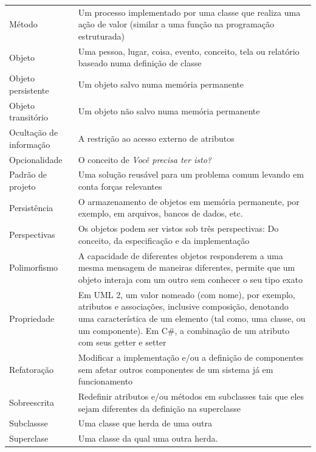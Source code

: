 \documentclass[
	11pt,				%
	openright,
	twoside,			%
	a4paper,			%
	english,			%
	french,
	brazil,				%
	sumario=tradicional
	]{abntex2}
\begin{document}
\begin{longtable}[l]{p{4.6cm}p{11.1cm}}
Método & Um processo implementado por uma classe que realiza uma ação de valor (similar a uma função na programação estruturada)\\

Objeto & Uma pessoa, lugar, coisa, evento, conceito, tela ou relatório baseado numa definição de classe\\

Objeto persistente & Um objeto salvo numa memória permanente\\

Objeto transitório & Um objeto não salvo numa memória permanente\\

Ocultação de informação & A restrição ao acesso externo de atributos\\

Opcionalidade & O conceito de \emph{Você precisa ter isto?}\\

Padrão de projeto & Uma solução reusável para um problema comum levando em conta forças relevantes\\

Persistência & O armazenamento de objetos em memória permanente, por exemplo, em arquivos, bancos de dados, etc.\\

Perspectivas & Os objetos podem ser vistos sob três perspectivas: Do conceito, da especificação e da implementação \\

Polimorfismo & A capacidade de diferentes objetos responderem a uma mesma mensagem de maneiras diferentes, permite que um objeto interaja com um outro sem conhecer o seu tipo exato\\

Propriedade & Em UML 2, um valor nomeado (com nome), por exemplo, atributos e associações, inclusive composição, denotando uma característica de um elemento (tal como, uma classe, ou um componente). Em C\#, a combinação de um atributo com seus getter e setter \\

Refatoração & Modificar a implementação e/ou a definição de componentes sem afetar outros componentes de um sistema já em funcionamento\\

Sobreescrita & Redefinir atributos e/ou métodos em subclasses tais que eles sejam diferentes da definição na superclasse\\

Subclassse & Uma classe que herda de uma outra\\

Superclase & Uma classe da qual uma outra herda.\\

\end{longtable}
\end{document}
